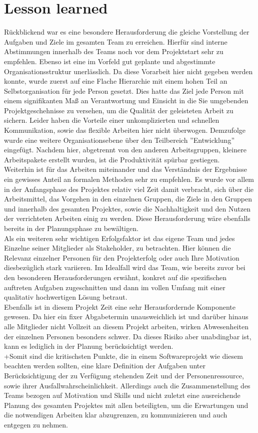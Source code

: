 \documentclass[12pt,a4paper]{article}
\begin{document}
\section{Lesson learned}
Rückblickend war es eine besondere Herausforderung die gleiche Vorstellung der Aufgaben und Ziele im gesamten Team zu erreichen. Hierfür sind interne Abstimmungen innerhalb des Teams noch vor dem Projektstart sehr zu empfehlen. Ebenso ist eine im Vorfeld gut geplante und abgestimmte Organisationsstruktur unerlässlich. Da diese Vorarbeit hier nicht gegeben werden konnte, wurde zuerst auf eine Flache Hierarchie mit einem hohen Teil an Selbstorganisation für jede Person gesetzt. Dies hatte das Ziel jede Person mit einem signifikanten Maß an Verantwortung und Einsicht in die Sie umgebenden Projektgeschehnisse zu versehen, um die Qualität der geleisteten Arbeit zu sichern. Leider haben die Vorteile einer unkomplizierten und schnellen Kommunikation, sowie das flexible Arbeiten hier nicht überwogen. Demzufolge wurde eine weitere Organisationsebene über den Teilbereich ''Entwicklung'' eingefügt. Nachdem hier, abgetrennt von den anderen Arbeitsgruppen, kleinere Arbeitspakete erstellt wurden, ist die Produktivität spürbar gestiegen. \\
Weiterhin ist für das Arbeiten miteinander und das Verständnis der Ergebnisse ein gewisses Anteil an formalen Methoden sehr zu empfehlen. Es wurde vor allem in der Anfangsphase des Projektes relativ viel Zeit damit verbracht, sich über die Arbeitsmittel, das Vorgehen in den einzelnen Gruppen, die Ziele in den Gruppen und innerhalb des gesamten Projektes, sowie die Nachhaltigkeit und den Nutzen der verrichteten Arbeiten einig zu werden. Diese Herausforderung wäre ebenfalls bereits in der Planungsphase zu bewältigen.\\
Als ein weiteren sehr wichtigen Erfolgsfaktor ist das eigene Team und jedes Einzelne seiner Mitglieder als Stakeholder, zu betrachten. Hier können die Relevanz einzelner Personen für den Projekterfolg oder auch Ihre Motivation diesbezüglich stark variieren. Im Idealfall wird das Team, wie bereits zuvor bei den besonderen Herausforderungen erwähnt, konkret auf die spezifischen auftreten Aufgaben zugeschnitten und dann im vollen Umfang mit einer qualitativ hochwertigen Lösung betraut.\\
Ebenfalls ist in diesem Projekt Zeit eine sehr Herausfordernde Komponente gewesen. Da hier ein fixer Abgabetermin unausweichlich ist und darüber hinaus alle Mitglieder nicht Vollzeit an diesem Projekt arbeiten, wirken Abwesenheiten der einzelnen Personen besonders schwer. Da dieses Risiko aber unabdingbar ist, kann es lediglich in der Planung berücksichtigt werden.\\
+Somit sind die kritischsten Punkte, die in einem Softwareprojekt wie diesem beachten werden sollten, eine klare Definition der Aufgaben unter Berücksichtigung der zu Verfügung stehenden Zeit und der Personenressource, sowie ihrer Ausfallwahrscheinlichkeit. Allerdings auch die Zusammenstellung des Teams bezogen auf Motivation und Skills und nicht zuletzt eine ausreichende Planung des gesamten Projektes mit allen beteiligten, um die Erwartungen und die notwendigen Arbeiten klar abzugrenzen, zu kommunizieren und auch entgegen zu nehmen.
\newpage
\end{document}
